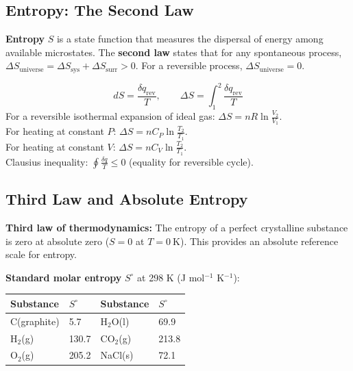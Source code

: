 \documentclass[12pt,a4paper]{article}
\begin{document}
\subsection{Entropy: The Second Law}
\begin{tcolorbox}[defbox]
\textbf{Entropy} $S$ is a state function that measures the dispersal of energy among available microstates. The \textbf{second law} states that for any spontaneous process, $\Delta S_{\mathrm{universe}} = \Delta S_{\mathrm{sys}} + \Delta S_{\mathrm{surr}} > 0$. For a reversible process, $\Delta S_{\mathrm{universe}} = 0$.
\end{tcolorbox}

\begin{tcolorbox}[formulabox, title={Entropy Expressions}]
\[
dS = \frac{\delta q_{\mathrm{rev}}}{T}, \qquad \Delta S = \int_1^2 \frac{\delta q_{\mathrm{rev}}}{T}
\]
For a reversible isothermal expansion of ideal gas: $\Delta S = nR\ln\frac{V_2}{V_1}$.\\
For heating at constant $P$: $\Delta S = nC_P\ln\frac{T_2}{T_1}$.\\
For heating at constant $V$: $\Delta S = nC_V\ln\frac{T_2}{T_1}$.\\
Clausius inequality: $\oint \frac{\delta q}{T} \leq 0$ (equality for reversible cycle).
\end{tcolorbox}

\subsection{Third Law and Absolute Entropy}
\begin{tcolorbox}[defbox]
\textbf{Third law of thermodynamics:} The entropy of a perfect crystalline substance is zero at absolute zero ($S = 0$ at $T = 0\ \mathrm{K}$). This provides an absolute reference scale for entropy.
\end{tcolorbox}

\textbf{Standard molar entropy} $S^\circ$ at 298 K (J mol$^{-1}$ K$^{-1}$):
\begin{tabularx}{\linewidth}{|B{2.6cm}|Y|B{2.6cm}|Y|}
\hline
\textbf{Substance} & \textbf{$S^\circ$} & \textbf{Substance} & \textbf{$S^\circ$} \\
\hline
C(graphite) & 5.7 & H$_2$O(l) & 69.9 \\
\hline
H$_2$(g) & 130.7 & CO$_2$(g) & 213.8 \\
\hline
O$_2$(g) & 205.2 & NaCl(s) & 72.1 \\
\hline
\end{tabularx}
\end{document}
